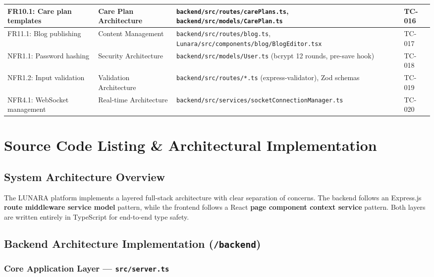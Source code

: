 \documentclass[12pt,letterpaper]{article}
\begin{document}
{\begin{longtable}{|>{\raggedright\arraybackslash}p{2.2cm}|>{\raggedright\arraybackslash}p{2.5cm}|>{\raggedright\arraybackslash}p{5.5cm}|>{\raggedright\arraybackslash}p{2.5cm}|}
\hline
\rowcolor{TableRowAlt}
FR10.1: Care plan templates & Care Plan Architecture & \texttt{backend/src/routes/carePlans.ts}, \texttt{backend/src/models/CarePlan.ts} & TC-016 \\
\hline
FR11.1: Blog publishing & Content Management & \texttt{backend/src/routes/blog.ts}, \texttt{Lunara/src/components/blog/BlogEditor.tsx} & TC-017 \\
\hline
\rowcolor{TableRowAlt}
NFR1.1: Password hashing & Security Architecture & \texttt{backend/src/models/User.ts} (bcrypt 12 rounds, pre-save hook) & TC-018 \\
\hline
NFR1.2: Input validation & Validation Architecture & \texttt{backend/src/routes/*.ts} (express-validator), Zod schemas & TC-019 \\
\hline
\rowcolor{TableRowAlt}
NFR4.1: WebSocket management & Real-time Architecture & \texttt{backend/src/services/socketConnectionManager.ts} & TC-020 \\
\hline
\end{longtable}
}

\newpage

\section{Source Code Listing \& Architectural Implementation}

\subsection{System Architecture Overview}

The LUNARA platform implements a layered full-stack architecture with clear separation of concerns. The backend follows an Express.js \textbf{route \textrightarrow{} middleware \textrightarrow{} service \textrightarrow{} model} pattern, while the frontend follows a React \textbf{page \textrightarrow{} component \textrightarrow{} context \textrightarrow{} service} pattern. Both layers are written entirely in TypeScript for end-to-end type safety.

\subsection{Backend Architecture Implementation (\texttt{/backend})}

\subsubsection{Core Application Layer --- \texttt{src/server.ts}}
\end{document}
